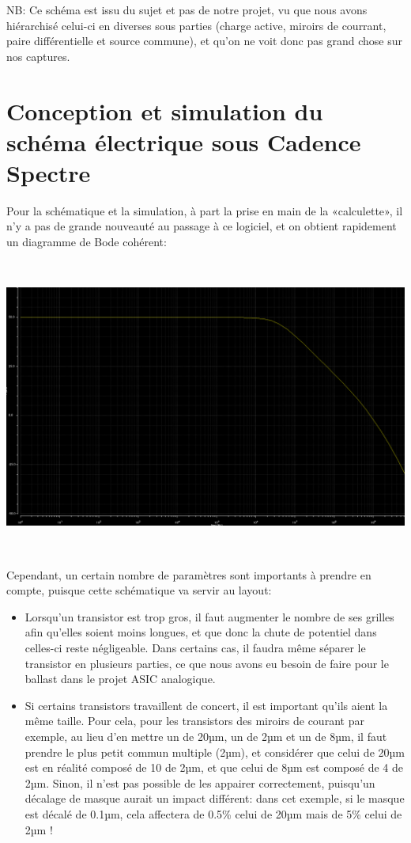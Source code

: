 \documentclass{article}
\begin{document}
NB: Ce schéma est issu du sujet et pas de notre projet, vu que nous avons hiérarchisé celui-ci en diverses sous parties (charge active, miroirs de courrant, paire différentielle et source commune), et qu’on ne voit donc pas grand chose sur nos captures.

\newpage

\section{Conception et simulation du schéma électrique sous Cadence Spectre}

Pour la schématique et la simulation, à part la prise en main de la «calculette»,
il n’y a pas de grande nouveauté au passage à ce logiciel, et on obtient rapidement
un diagramme de Bode cohérent:

~

\includegraphics[width=\linewidth]{bode_sch.png}

~

Cependant, un certain nombre de paramètres sont importants à prendre en compte, puisque cette schématique va servir au layout:
\begin{itemize}
    \item Lorsqu’un transistor est trop gros, il faut augmenter le nombre de ses grilles afin qu’elles soient moins longues, et que donc la chute de potentiel dans celles-ci reste négligeable. Dans certains cas, il faudra même séparer le transistor en plusieurs parties, ce que nous avons eu besoin de faire pour le ballast dans le projet ASIC analogique.
    \item Si certains transistors travaillent de concert, il est important qu’ils aient la même taille. Pour cela, pour les transistors des miroirs de courant par exemple, au lieu d’en mettre un de 20µm, un de 2µm et un de 8µm, il faut prendre le plus petit commun multiple (2µm), et considérer que celui de 20µm est en réalité composé de 10 de 2µm, et que celui de 8µm est composé de 4 de 2µm. Sinon, il n’est pas possible de les appairer correctement, puisqu’un décalage de masque aurait un impact différent: dans cet exemple, si le masque est décalé de 0.1µm, cela affectera de 0.5\% celui de 20µm mais de 5\% celui de 2µm !
\end{itemize}
\end{document}
